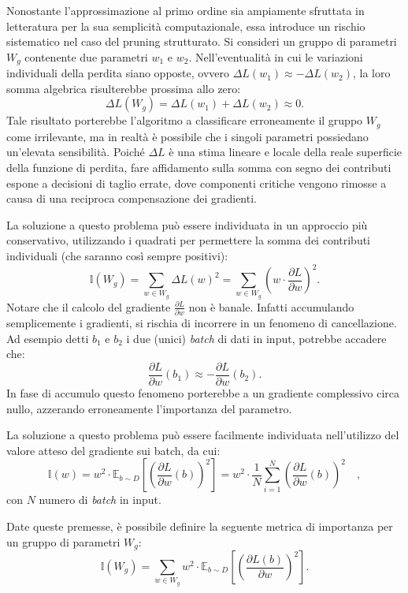 Nonostante l'approssimazione al primo ordine sia ampiamente sfruttata in
letteratura \cite{Metrics} per la sua semplicità computazionale, essa introduce
un rischio sistematico nel caso del pruning strutturato. Si consideri un gruppo
di parametri $W_g$ contenente due parametri $w_1$ e $w_2$. Nell'eventualità in
cui le variazioni individuali della perdita siano opposte, ovvero \mbox{$\Delta
        L(w_1) \approx - \Delta L(w_2)$}, la loro somma algebrica risulterebbe prossima
allo zero:
\begin{equation}
    \Delta L(W_g) = \Delta L(w_1) + \Delta L(w_2) \approx 0.
\end{equation}
Tale risultato porterebbe l'algoritmo a classificare erroneamente il gruppo $W_g$ come irrilevante, ma in realtà è possibile che i singoli parametri possiedano un'elevata sensibilità. Poiché $\Delta L$ è una stima lineare e locale della reale superficie della funzione di perdita, fare affidamento sulla somma con segno dei contributi espone a decisioni di taglio errate, dove componenti critiche vengono rimosse a causa di una reciproca compensazione dei gradienti. \par
La soluzione a questo problema può essere individuata in un approccio più
conservativo, utilizzando i quadrati per permettere la somma dei contributi
individuali (che saranno così sempre positivi):
\begin{equation}
    {\mathbb{I}}(W_g) = \sum_{w \in W_g} \Delta L(w)^2 = \sum_{w \in W_g} \left ( w \cdot \frac{\partial L}{\partial w}\right )^2.
\end{equation} \newline
Notare che il calcolo del gradiente $\frac{\partial L}{\partial w}$ non è banale. Infatti accumulando semplicemente i gradienti, si rischia di incorrere in un fenomeno di cancellazione. Ad esempio detti $b_1$ e $b_2$ i due (unici) \textit{batch} di dati in input, potrebbe accadere che:
\begin{equation}
    \frac{\partial L}{\partial w}(b_1) \approx - \frac{\partial L}{\partial w}(b_2).
\end{equation}
In fase di accumulo questo fenomeno porterebbe a un gradiente complessivo circa nullo, azzerando erroneamente l'importanza del parametro. \par
La soluzione a questo problema può essere facilmente individuata nell'utilizzo
del valore atteso del gradiente sui batch, da cui:
\begin{equation}
    {\mathbb{I}}(w) = w^2 \cdot \mathbb{E}_{b \sim {D}}\left [\left(\frac{\partial L}{\partial w}(b)\right)^2\right ] = w^2 \cdot \frac{1}{N} \sum_{i=1}^{N} \left (\frac{\partial L}{\partial w}(b) \right)^2 \quad,
\end{equation}
con $N$ numero di \textit{batch} in input. \par
Date queste premesse, è possibile definire la seguente metrica di importanza
per un gruppo di parametri $W_g$:
\begin{equation}
    {\mathbb{I}}(W_g) =\sum_{w \in W_g} w^2 \cdot \mathbb{E}_{b \sim {D}} \left[ \left( \frac{\partial L(b)}{\partial w} \right)^2 \right].
\end{equation}

